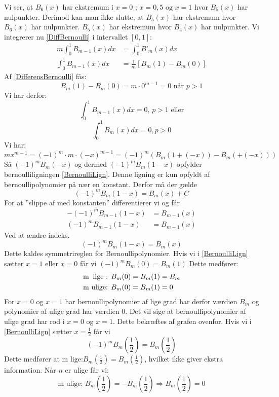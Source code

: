 Vi ser, at \(B_{6}(x)\) har ekstremum i \(x=0 \text{ ; }x=0,5 \text{ og } x=1\) hvor \(B_{5}(x)\) har nulpunkter.
Derimod kan man ikke slutte, at \(B_{5}(x)\) har ekstremum hvor \(B_{6}(x)\) har nulpunkter.
\(B_{5}(x)\) har ekstremum hvor \(B_{4}(x)\) har nulpunkter.
Vi integrerer nu \ref{DiffBernoulli} i intervallet \([0,1]\):
\begin{align*}
m\int_{0}^{1} \! B_{m-1}(x)dx&=\int_{0}^{1}B’_{m}(x)dx\\  
\int_{0}^{1} \! B_{m-1}(x)dx&=\frac{1}{m}[B_{m}(1)-B_{m}(0)]
\end{align*}
Af \ref{DifferensBernoulli} fås:
\[B_{m}(1)-B_{m}(0)=m \cdot 0^{m-1}=0 \text{  når  } p>1\]
Vi har derfor:
\[\int_{0}^{1} \! B_{m-1}(x)dx=0, \, p>1 \text{  eller}\]
\begin{equation}
\int_{0}^{1}B_{m}(x)dx=0, p>0
\end{equation}
Vi har:
\[mx^{m-1}=(-1)^{m} \cdot m \cdot (-x)^{m-1}=(-1)^{m}(B_{m}(1+(-x))-B_{m}(+(-x)))\]
Så \((-1)^{m}B_{m}(-x)\) og dermed \((-1)^{m}B_{m}(1-x)\) opfylder bernoulliligningen \ref{BernoulliLign}.
Denne ligning er kun opfyldt af bernoullipolynomier på nær en konstant.
Derfor må der gælde 
\[(-1)^{m}B_{m}(1-x)=B_{m}(x)+C\]
For at ”slippe af med konstanten” differentierer vi og får
\begin{align*}
-(-1)^{m}B_{m-1}(1-x)&=B_{m-1}(x)\\
(-1)^{m}B_{m-1}(1-x)&=B_{m-1}(x) 
\end{align*}
Ved at ændre indeks.
\begin{equation}
(-1)^{m}B_{m}(1-x)=B_{m}(x)
\end{equation}
Dette kaldes symmetrireglen for Bernoullipolynomier.
Hvis vi i \ref{BernoulliLign} sætter \(x=1\) eller \(x=0\) får vi \((-1)^{m}B_{m}(0)=B_{m}(1)\)  
Dette medfører:
\begin{align}
&\text{m\phantom{u}lige : } B_{m}(0)=B_{m}(1)=B_{m}\\
&\text{m ulige: } B_{m}(0)=B_{m}(1)=0
\end{align}	 
For \(x=0\) og \(x=1\) har bernoullipolynomier af lige grad har derfor værdien \(B_{m}\) og polynomier af ulige grad har værdien \(0\). 
Det vil sige at  bernoullipolynomier af ulige grad har rod i \(x=0\) og \(x=1\). 
Dette bekræftes af grafen ovenfor.
Hvis vi i \ref{BernoulliLign} sætter \(x=\frac{1}{2}\)   får vi 
\[(-1)^{m}B_{m}(\frac{1}{2})=B_{m}(\frac{1}{2})\]  
Dette medfører at \(\text{m lige:} B_{m}(\frac{1}{2})=B_{m}(\frac{1}{2})\), hvilket ikke giver ekstra information. Når \(n\) er ulige får vi:
\[\text{m ulige: } B_{m}(\frac{1}{2})=-B_{m}(\frac{1}{2}) \Rightarrow B_{m}(\frac{1}{2})=0\]
